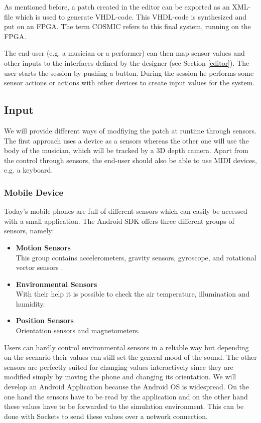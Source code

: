 	As mentioned before, a patch created in the editor can be exported as an XML-file which is used to generate VHDL-code. 
	This VHDL-code is synthesized and put on an \ac{FPGA}. 
	The term \ac{COSMIC} refers to this final system, running on the \ac{FPGA}.
	
	The end-user (e.g. a musician or a performer) can then map sensor values and other inputs to the interfaces defined by the designer (see Section \ref{editor}). 
	The user starts the session by pushing a button. 
	During the session he performs some sensor actions or actions with other devices to create input values for the system.
	
\subsection{Input}
We will provide different ways of modfiying the patch at runtime through sensors. 
The first approach uses a device as a sensors whereas the other one will use the body of the musician, which will be tracked by a 3D depth camera. 
Apart from the control through sensors, the end-user should also be able to use MIDI devices, e.g. a keyboard.

\subsubsection{Mobile Device}
Today's mobile phones are full of different sensors which can easily be accessed with a small application. The Android SDK offers three different groups of sensors, namely:
\begin{itemize}
	\item \textbf{Motion Sensors} \\
			This group contains accelerometers, gravity sensors, gyroscope, and rotational vector sensors .
	\item \textbf{Environmental Sensors} \\
			With their help it is possible to check the air temperature, illumination and humidity.
	\item \textbf{Position Sensors} \\
			Orientation sensors and magnetometers.
\end{itemize}

Users can hardly control environmental sensors in a reliable way but depending on the scenario their values can still set the general mood of the sound.
The other sensors are perfectly suited for changing values interactively since they are modified simply by moving the phone and changing its orientation. 
We will develop an Android Application because the Android OS is widespread. 
On the one hand the sensors have to be read by the application and on the other hand these values have to be forwarded to the simulation environment. 
This can be done with Sockets to send these values over a network connection.


